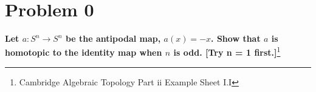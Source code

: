 
\section{Problem 0}
\begin{exercise}
  \textbf{Let $a : S^n \to S^n$ be the antipodal map, $a(x) = -x$. Show that $a$ is homotopic to the identity map when $n$ is odd. [Try n = 1 first.]}\footnote{Cambridge Algebraic Topology Part ii Example Sheet I.I}
\end{exercise}

\begin{solution}

\end{solution}
